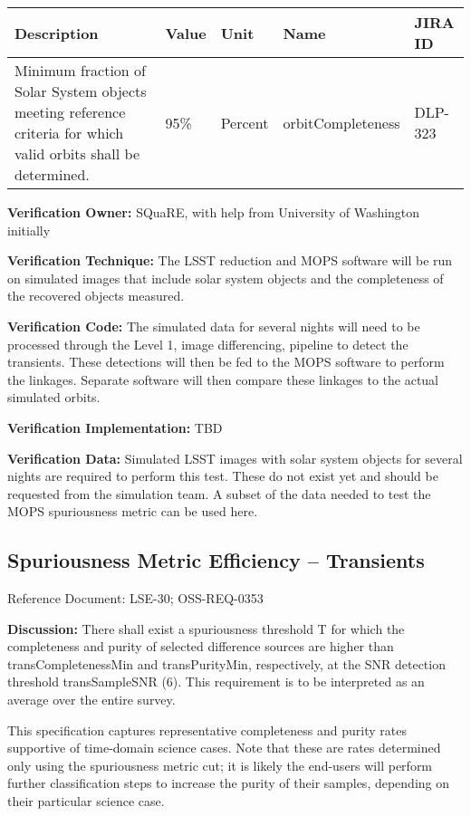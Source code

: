\documentclass[DM,lsstdraft,toc]{lsstdoc}
\begin{document}
\begin{longtable}[]{@{}p{}llll@{}}
\toprule
Description & Value & Unit & Name & JIRA ID\tabularnewline
\midrule
\endhead
Minimum fraction of Solar System objects meeting reference criteria for
which valid orbits shall be determined. & 95\% & Percent &
orbitCompleteness & DLP-323\tabularnewline
\bottomrule
\end{longtable}

\textbf{Verification Owner:} SQuaRE, with help from University of
Washington initially

\textbf{Verification Technique:} The LSST reduction and MOPS software
will be run on simulated images that include solar system objects and
the completeness of the recovered objects measured.

\textbf{Verification Code:} The simulated data for several nights will
need to be processed through the Level 1, image differencing, pipeline
to detect the transients. These detections will then be fed to the MOPS
software to perform the linkages. Separate software will then compare
these linkages to the actual simulated orbits.

\textbf{Verification Implementation:} TBD

\textbf{Verification Data:} Simulated LSST images with solar system
objects for several nights are required to perform this test. These do
not exist yet and should be requested from the simulation team. A subset
of the data needed to test the MOPS spuriousness metric can be used
here.

\subsection{Spuriousness Metric Efficiency --
Transients}\label{spuriousness-metric-efficiency-transients}

Reference Document: LSE-30; OSS-REQ-0353

\textbf{Discussion:} There shall exist a spuriousness threshold T for
which the completeness and purity of selected difference sources are
higher than transCompletenessMin and transPurityMin, respectively, at
the SNR detection threshold transSampleSNR (6). This requirement is to
be interpreted as an average over the entire survey.

This specification captures representative completeness and purity rates
supportive of time-domain science cases. Note that these are rates
determined only using the spuriousness metric cut; it is likely the
end-users will perform further classification steps to increase the
purity of their samples, depending on their particular science case.
\end{document}
